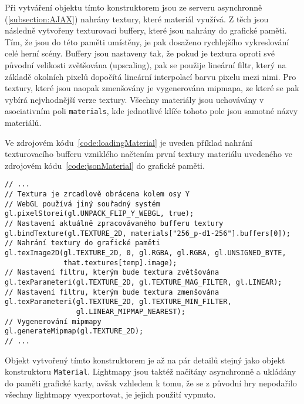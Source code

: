 Při vytváření objektu tímto konstruktorem jsou ze serveru asynchronně (\ref{subsection:AJAX}) nahrány textury, které materiál využívá. Z těch jsou následně vytvořeny texturovací buffery, které jsou nahrány do grafické paměti. Tím, že jsou do této paměti umístěny, je pak dosaženo rychlejšího vykreslování celé herní scény. Buffery jsou nastaveny tak, že pokud je textura oproti své původní velikosti zvětšována (upscaling), pak se použije lineární filtr, který na základě okolních pixelů dopočítá lineární interpolací barvu pixelu mezi nimi. Pro textury, které jsou naopak zmenšovány je vygenerována mipmapa, ze které se pak vybírá nejvhodnější verze textury. Všechny materiály jsou uchovávány v asociativním poli \texttt{materials}, kde jednotlivé klíče tohoto pole jsou samotné názvy materiálů. 

Ve zdrojovém kódu~\ref{code:loadingMaterial} je uveden příklad nahrání texturovacího bufferu vzniklého načtením první textury materiálu uvedeného ve zdrojovém kódu~\ref{code:jsonMaterial} do grafické paměti.

\begin{lstlisting}[caption=Příklad nahrání textury do grafické paměti,label=code:loadingMaterial]
// ...	
// Textura je zrcadlově obrácena kolem osy Y
// WebGL používá jiný souřadný systém
gl.pixelStorei(gl.UNPACK_FLIP_Y_WEBGL, true);
// Nastavení aktuálně zpracovávaného bufferu textury
gl.bindTexture(gl.TEXTURE_2D, materials["256_p-d1-256"].buffers[0]); 
// Nahrání textury do grafické paměti
gl.texImage2D(gl.TEXTURE_2D, 0, gl.RGBA, gl.RGBA, gl.UNSIGNED_BYTE, 
              that.textures[temp].image);
// Nastavení filtru, kterým bude textura zvětšována
gl.texParameteri(gl.TEXTURE_2D, gl.TEXTURE_MAG_FILTER, gl.LINEAR);
// Nastavení filtru, kterým bude textura zmenšována
gl.texParameteri(gl.TEXTURE_2D, gl.TEXTURE_MIN_FILTER, 
                 gl.LINEAR_MIPMAP_NEAREST);
// Vygenerování mipmapy
gl.generateMipmap(gl.TEXTURE_2D);
// ...
\end{lstlisting}

Objekt vytvořený tímto konstruktorem je až na pár detailů stejný jako objekt konstruktoru \texttt{Material}. Lightmapy jsou taktéž načítány asynchronně a ukládány do paměti grafické karty, avšak vzhledem k tomu, že se z původní hry nepodařilo všechny lightmapy vyexportovat, je jejich použití vypnuto.

